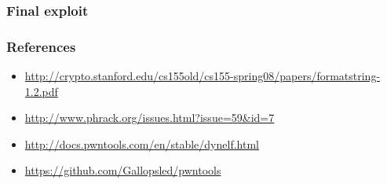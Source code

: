 \documentclass[t]{beamer}
\begin{document}
\begin{frame}[fragile]
    \frametitle{Final exploit}
    
\end{frame}

\begin{frame}[fragile]
    \frametitle{References}
    \begin{itemize}
        \item \url{http://crypto.stanford.edu/cs155old/cs155-spring08/papers/formatstring-1.2.pdf}
        \item \url{http://www.phrack.org/issues.html?issue=59&id=7}
        \item \url{http://docs.pwntools.com/en/stable/dynelf.html}
        \item \url{https://github.com/Gallopsled/pwntools}
    \end{itemize}
\end{frame}
\end{document}
